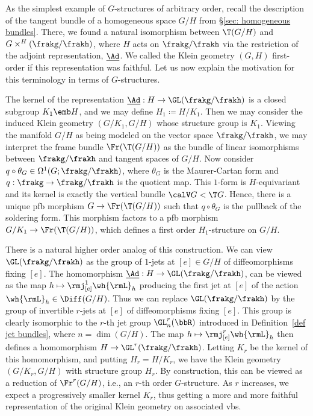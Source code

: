 \begin{rem}\label{rem higher order Klein geometry}
    As the simplest example of $G$-structures of arbitrary order, recall the description of the tangent bundle of a homogeneous space $G\slash H$ from \S\ref{sec: homogeneous bundles}. There, we found a natural isomorphism between $\T(G\slash H)$ and $G\times^H (\frakg\slash\frakh)$, where $H$ acts on $\frakg\slash\frakh$ via the restriction of the adjoint representation,  $\underline{\Ad}$. We called the Klein geometry $(G,H)$ first-order if this representation was faithful. Let us now explain the motivation for this terminology in terms of $G$-structures.

    The kernel of the representation $\underline{\Ad}:H\to \GL(\frakg\slash\frakh)$ is a closed subgroup $K_1\emb H$, and we may define $H_1\coloneqq H\slash K_1$. Then we may consider the induced Klein geometry $(G\slash K_1,G\slash H)$ whose structure group is $K_1$. Viewing the manifold $G\slash H$ as being modeled on the vector space $\frakg\slash\frakh$, we may interpret the frame bundle $\Fr(\T(G\slash H))$ as the bundle of linear isomorphisms between $\frakg\slash\frakh$ and tangent spaces of $G\slash H$. Now consider $q\circ \theta_G\in \Omega^1(G;\frakg\slash\frakh)$, where $\theta_G$ is the Maurer-Cartan form and $q:\frakg\to\frakg\slash\frakh$ is the quotient map. This $1$-form is $H$-equivariant and its kernel is exactly the vertical bundle $\calV G<\T G$. Hence, there is a unique \gls{pfb} morphism $G\to \Fr(\T(G\slash H))$ such that $q\circ \theta_G$ is the pullback of the soldering form. This morphism factors to a \gls{pfb} morphism $G\slash K_1\to \Fr(\T(G\slash H))$, which defines a first order $H_1$-structure on $G\slash H$.

    There is a natural higher order analog of this construction. We can view $\GL(\frakg\slash\frakh)$ as the group of $1$-jets at $[e]\in G\slash H$ of diffeomorphisms fixing $[e]$. The homomorphism $\underline{\Ad}:H\to \GL(\frakg\slash\frakh)$, can be viewed as the map $h\mapsto \rmj^1_{[e]}\wh{\rmL}_h$ producing the first jet at $[e]$ of the action $\wh{\rmL}_h\in\Diff(G\slash H)$. Thus we can replace $\GL(\frakg\slash\frakh)$ by the group of invertible $r$-jets at $[e]$ of diffeomorphisms fixing $[e]$. This group is clearly isomorphic to the $r$-th jet group $\GL^r_n(\bbR)$ introduced in Definition~\ref{def jet bundles}, where $n=\dim(G\slash H)$. The map $h\mapsto \rmj^r_{[e]}\wh{\rmL}_h$ then defines a homomorphism $H\to \GL^r(\frakg\slash\frakh)$. Letting $K_r$ be the kernel of this homomorphism, and putting $H_r=H\slash K_r$, we have the Klein geometry $(G\slash K_r,G\slash H)$ with structure group $H_r$. By construction, this can be viewed as a reduction of $\Fr^r(G\slash H)$, i.e., an $r$-th order $G$-structure. As $r$ increases, we expect a progressively smaller kernel $K_r$, thus getting a more and more faithful representation of the original Klein geometry on associated \glspl{vb}.


\end{rem}
